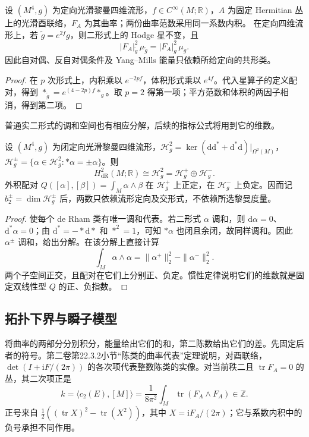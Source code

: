 \begin{proposition}\label{g3:prop:B-conformal-invariance}
	设 \((M^4,g)\) 为定向光滑黎曼四维流形，\(f\in C^\infty(M;\mathbb R)\)，\(A\) 为固定 Hermitian 丛上的光滑酉联络，\(F_A\) 为其曲率；两份曲率范数采用同一系数内积。
	在定向四维流形上，若 \(\widetilde g=e^{2f}g\)，则二形式上的 Hodge 星不变，且
	\[
		|F_A|_{\widetilde g}^2\,\mu_{\widetilde g}
		=|F_A|_g^2\,\mu_g.
	\]
	因此自对偶、反自对偶条件及 Yang--Mills 能量只依赖所给定向的共形类。
\end{proposition}
\begin{proof}
	在 \(p\) 次形式上，内积乘以 \(e^{-2pf}\)，体积形式乘以 \(e^{4f}\)。代入星算子的定义配对，得到
	\(*_{\widetilde g}=e^{(4-2p)f}*_g\)。取 \(p=2\) 得第一项；平方范数和体积的两因子相消，得到第二项。
\end{proof}

普通实二形式的调和空间也有相应分解，后续的指标公式将用到它的维数。

\begin{proposition}\label{g3:prop:B-harmonic-self-dual-split}
	设 \((M^4,g)\) 为闭定向光滑黎曼四维流形，\(\mathcal H_g^2=\ker(\mathrm d\mathrm d^*+\mathrm d^*\mathrm d)|_{\Omega^2(M)}\)，\(\mathcal H_g^\pm=\{\alpha\in\mathcal H_g^2:*\alpha=\pm\alpha\}\)。则
	\[
		H_{\mathrm{dR}}^2(M;\mathbb R)
		\cong\mathcal H_g^2
		=\mathcal H_g^+\oplus\mathcal H_g^-.
	\]
	外积配对 \(Q([\alpha],[\beta])=\int_M\alpha\wedge\beta\) 在
	\(\mathcal H_g^+\) 上正定，在 \(\mathcal H_g^-\) 上负定。因而记
	\(b_2^\pm=\dim\mathcal H_g^\pm\) 后，两数只依赖流形定向及交形式，不依赖所选黎曼度量。
\end{proposition}
\begin{proof}
	使每个 de Rham 类有唯一调和代表。若二形式 \(\alpha\) 调和，则 \(\mathrm d\alpha=0\)、\(\mathrm d^*\alpha=0\)；由 \(\mathrm d^*=-*\mathrm d*\) 和 \(*^2=1\)，可知 \(*\alpha\) 也闭且余闭，故同样调和。因此 \(\alpha^\pm\) 调和，给出分解。在该分解上直接计算
	\[
		\int_M\alpha\wedge\alpha
		=\|\alpha^+\|_2^2-\|\alpha^-\|_2^2.
	\]
	两个子空间正交，且配对在它们上分别正、负定。惯性定律说明它们的维数就是固定双线性型 \(Q\) 的正、负指数。
\end{proof}

\subsection{拓扑下界与瞬子模型}
\label{g3:subsec:B01:04}

将曲率的两部分分别积分，能量给出它们的和，第二陈数给出它们的差。先固定后者的符号。第二卷第22.3.2小节“陈类的曲率代表”定理说明，对酉联络，\(\det(I+\mathrm iF/(2\pi))\) 的各次项代表整数陈类的实像。对当前秩二且 \(\operatorname{tr}F_A=0\) 的丛，其二次项正是
\begin{equation}\label{g3:eq:B-second-chern-number}
	k=\langle c_2(E),[M]\rangle
	=\frac1{8\pi^2}\int_M\operatorname{tr}(F_A\wedge F_A)
	\in\mathbb Z.
\end{equation}
正号来自
\(\frac12((\operatorname{tr}X)^2-\operatorname{tr}(X^2))\)，其中 \(X=\mathrm iF_A/(2\pi)\)；它与系数内积中的负号承担不同作用。

